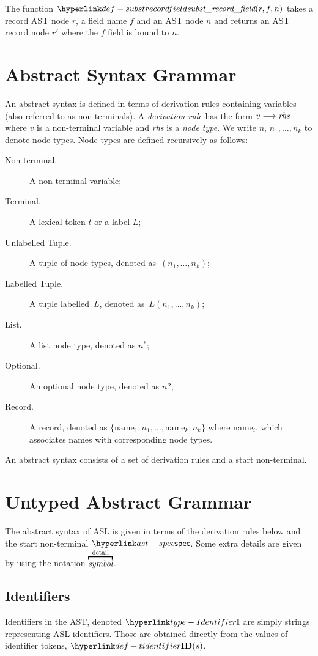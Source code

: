 \hypertarget{def-substrecordfield}{}
The function $\substrecordfield(r, f, n)$ takes a record AST node $r$, a field name $f$ and an AST node $n$
and returns an AST record node $r'$ where the $f$ field is bound to $n$.

\section{Abstract Syntax Grammar\label{sec:AbstractSyntaxGrammar}}

An abstract syntax is defined in terms of derivation rules containing variables (also referred to as non-terminals).
%
A \emph{derivation rule} has the form $v \longrightarrow \textit{rhs}$ where $v$ is a non-terminal variable and \textit{rhs} is a \emph{node type}. We write $n$, $n_1,\ldots,n_k$ to denote node types.
%
Node types are defined recursively as follows:
\begin{description}
\item[Non-terminal.] A non-terminal variable;
\item[Terminal.] A lexical token $t$ or a label $L$;
\item[Unlabelled Tuple.] A tuple of node types, denoted as~$(n_1,\ldots,n_k)$;
\item[Labelled Tuple.] A tuple labelled~$L$, denoted as~$L(n_1,\ldots,n_k)$;
\item[List.] A list node type, denoted as $n^{*}$;
\item[Optional.] An optional node type, denoted as $n?$;
\item[Record.] A record, denoted as $\{\text{name}_1 : n_1,\ldots,\text{name}_k : n_k\}$ where $\text{name}_i$, which associates names with corresponding node types.
\end{description}

\newpage

An abstract syntax consists of a set of derivation rules and a start non-terminal.

\section{Untyped Abstract Grammar\label{sec:UntypedAbstractGrammar}}

The abstract syntax of ASL is given in terms of the derivation rules below and the start non-terminal $\spec$.
%
Some extra details are given by using the notation $\overtext{\textit{symbol}}{\text{detail}}$.

\subsection{Identifiers \label{sec:Identifiers}}
Identifiers in the AST, denoted $\Identifier$ are simply strings representing ASL identifiers.
Those are obtained directly from the values of identifier tokens, $\Tidentifier(s)$.

